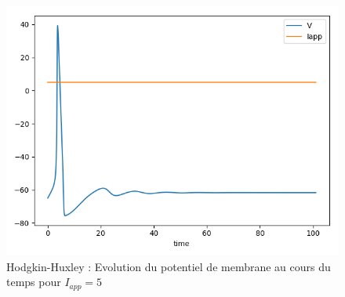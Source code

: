\documentclass[12pt]{scrartcl}
\begin{document}
\begin{figure}[!h]
\centering
\includegraphics[scale=0.5]{imgs/hh11.png}
\caption{Hodgkin-Huxley : Evolution du potentiel de membrane au cours du temps pour $I_{app} = 5$}
\label{hh11}
\end{figure}
\end{document}
